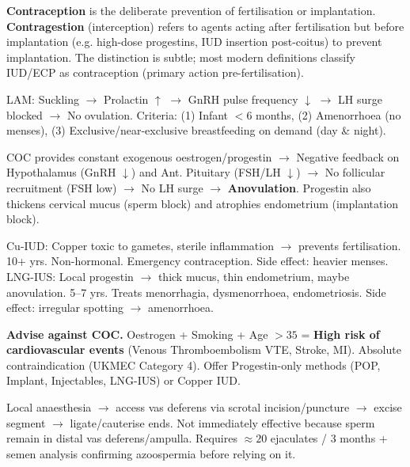 \documentclass[11pt]{article}
\begin{document}
\begin{corrige}[Exercise 1]
\textbf{Contraception} is the deliberate prevention of fertilisation or implantation. \textbf{Contragestion} (interception) refers to agents acting after fertilisation but before implantation (e.g. high-dose progestins, IUD insertion post-coitus) to prevent implantation. The distinction is subtle; most modern definitions classify IUD/ECP as contraception (primary action pre-fertilisation).
\end{corrige}

\begin{corrige}[Exercise 2]
LAM: Suckling $\to$ Prolactin $\uparrow$ $\to$ GnRH pulse frequency $\downarrow$ $\to$ LH surge blocked $\to$ No ovulation.
Criteria: (1) Infant $< 6$ months, (2) Amenorrhoea (no menses), (3) Exclusive/near-exclusive breastfeeding on demand (day \& night).
\end{corrige}

\begin{corrige}[Exercise 3]
COC provides constant exogenous oestrogen/progestin $\to$ Negative feedback on Hypothalamus (GnRH $\downarrow$) and Ant. Pituitary (FSH/LH $\downarrow$) $\to$ No follicular recruitment (FSH low) $\to$ No LH surge $\to$ \textbf{Anovulation}. Progestin also thickens cervical mucus (sperm block) and atrophies endometrium (implantation block).
\end{corrige}

\begin{corrige}[Exercise 4]
Cu-IUD: Copper toxic to gametes, sterile inflammation $\to$ prevents fertilisation. 10+ yrs. Non-hormonal. Emergency contraception. Side effect: heavier menses.
LNG-IUS: Local progestin $\to$ thick mucus, thin endometrium, maybe anovulation. 5--7 yrs. Treats menorrhagia, dysmenorrhoea, endometriosis. Side effect: irregular spotting $\to$ amenorrhoea.
\end{corrige}

\begin{corrige}[Exercise 5]
\textbf{Advise against COC.} Oestrogen + Smoking + Age $>35$ = \textbf{High risk of cardiovascular events} (Venous Thromboembolism VTE, Stroke, MI). Absolute contraindication (UKMEC Category 4). Offer Progestin-only methods (POP, Implant, Injectables, LNG-IUS) or Copper IUD.
\end{corrige}

\begin{corrige}[Exercise 6]
Local anaesthesia $\to$ access vas deferens via scrotal incision/puncture $\to$ excise segment $\to$ ligate/cauterise ends. Not immediately effective because sperm remain in distal vas deferens/ampulla. Requires $\approx 20$ ejaculates / 3 months + semen analysis confirming azoospermia before relying on it.
\end{corrige}
\end{document}
